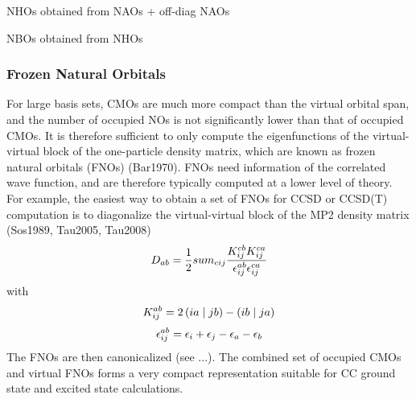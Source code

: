 NHOs obtained from NAOs + off-diag NAOs 

NBOs obtained from NHOs





\subsubsection*{Frozen Natural Orbitals}

For large basis sets, CMOs are much more compact than the virtual orbital span, and the number of occupied NOs is not significantly lower than that of occupied CMOs. It is therefore sufficient to only compute the eigenfunctions of the virtual-virtual block of the one-particle density matrix, which are known as frozen natural orbitals (FNOs) (Bar1970). FNOs need information of the correlated wave function, and are therefore typically computed at a lower level of theory. For example, the easiest way to obtain a set of FNOs for CCSD or CCSD(T) computation is to diagonalize the virtual-virtual block  of the MP2 density matrix (Sos1989, Tau2005, Tau2008)
\begin{equation}
D_{ab} = \frac{1}{2} sum_{cij} \frac{K_{ij}^{cb} K_{ij}^{ca}}{\epsilon_{ij}^{ab} \epsilon_{ij}^{ca}}
\end{equation}
\noindent with
\begin{equation}
K_{ij}^{ab} = 2 \left( ia \mid jb \right) - \left( ib \mid ja \right)
\end{equation}
\begin{equation}
\epsilon_{ij}^{ab} = \epsilon_i + \epsilon_j - \epsilon_a - \epsilon_b 
\end{equation}
The FNOs are then canonicalized (see ...). The combined set of occupied CMOs and virtual FNOs forms a very compact representation suitable for CC ground state and excited state calculations.



